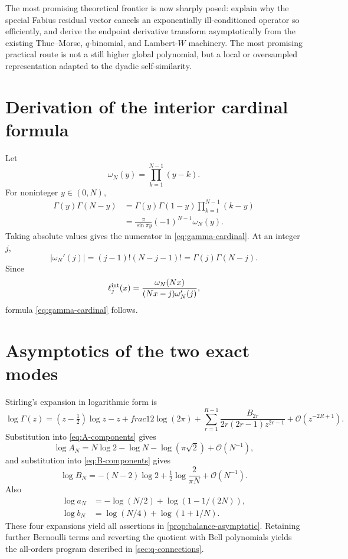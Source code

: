\documentclass[11pt,oneside]{article}
\numberwithin{equation}{section}
\theoremstyle{definition}
\theoremstyle{remark}
\newcommand{\bigO}{\mathcal O}
\begin{document}
The most promising theoretical frontier is now sharply posed: explain why the special
Fabius residual vector cancels an exponentially ill-conditioned operator so efficiently,
and derive the endpoint derivative transform asymptotically from the existing
Thue--Morse, $q$-binomial, and Lambert-$W$ machinery.  The most promising practical route is
not a still higher global polynomial, but a local or oversampled representation adapted to
the dyadic self-similarity.

\appendix

\section{Derivation of the interior cardinal formula}
\label{app:cardinal}

Let
\begin{equation}
 \omega_N(y)=\prod_{k=1}^{N-1}(y-k).
\end{equation}
For noninteger $y\in(0,N)$,
\begin{align}
 \Gamma(y)\Gamma(N-y)
 &=\Gamma(y)\Gamma(1-y)\prod_{k=1}^{N-1}(k-y)\\
 &=\frac{\pi}{\sin\pi y}(-1)^{N-1}\omega_N(y).
\end{align}
Taking absolute values gives the numerator in \eqref{eq:gamma-cardinal}.  At an integer
$j$,
\begin{equation}
 |\omega_N'(j)|=(j-1)!(N-j-1)!=\Gamma(j)\Gamma(N-j).
\end{equation}
Since
\begin{equation}
 \ell_j^{\rm int}(x)=
 \frac{\omega_N(Nx)}{(Nx-j)\omega_N'(j)},
\end{equation}
formula \eqref{eq:gamma-cardinal} follows.

\section{Asymptotics of the two exact modes}
\label{app:mode-asymptotics}

Stirling's expansion in logarithmic form is
\begin{equation}
 \log\Gamma(z)=\left(z-\tfrac12\right)\log z-z+	frac12\log(2\pi)
 +\sum_{r=1}^{R-1}\frac{B_{2r}}{2r(2r-1)z^{2r-1}}
 +\bigO(z^{-2R+1}).
\end{equation}
Substitution into \eqref{eq:A-components} gives
\begin{equation}
 \log A_N=N\log2-\log N-\log(\pi\sqrt2)+\bigO(N^{-1}),
\end{equation}
and substitution into \eqref{eq:B-components} gives
\begin{equation}
 \log B_N=-(N-2)\log2+\tfrac12\log\frac{2}{\pi N}
 +\bigO(N^{-1}).
\end{equation}
Also
\begin{align}
 \log a_N&=-\log(N/2)+\log(1-1/(2N)),\\
 \log b_N&=\log(N/4)+\log(1+1/N).
\end{align}
These four expansions yield all assertions in \cref{prop:balance-asymptotic}.  Retaining
further Bernoulli terms and reverting the quotient with Bell polynomials yields the
all-orders program described in \cref{sec:q-connections}.
\end{document}
